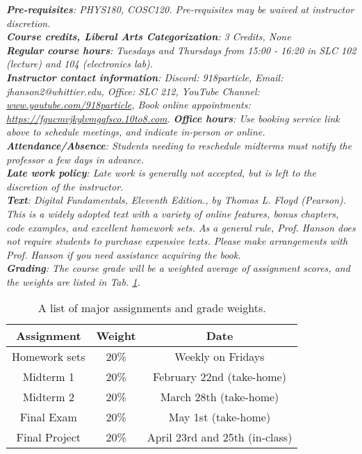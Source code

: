 \documentclass[10pt]{article}
\begin{document}
\noindent
\textit{\textbf{Pre-requisites}: PHYS180, COSC120.  Pre-requisites may be waived at instructor discretion.} \\
\textit{\textbf{Course credits, Liberal Arts Categorization}: 3 Credits, None} \\
\textit{\textbf{Regular course hours}: Tuesdays and Thursdays from 15:00 - 16:20 in SLC 102 (lecture) and 104 (electronics lab).} \\
\textit{\textbf{Instructor contact information}: Discord: 918particle, Email: jhanson2@whittier.edu, Office: SLC 212, YouTube Channel: \url{www.youtube.com/918particle}, Book online appointments: \url{https://fgucmvjkylvmgqfsco.10to8.com}.}
\noindent
\textit{\textbf{Office hours}: Use booking service link above to schedule meetings, and indicate in-person or online.} \\
\textit{\textbf{Attendance/Absence}: Students needing to reschedule midterms must notify the professor a few days in advance.} \\ 
\textit{\textbf{Late work policy}: Late work is generally not accepted, but is left to the discretion of the instructor.} \\
\textit{\textbf{Text}:  Digital Fundamentals, Eleventh Edition., by Thomas L. Floyd (Pearson).  This is a widely adopted text with a variety of online features, bonus chapters, code examples, and excellent homework sets.  As a general rule, Prof. Hanson does not require students to purchase expensive texts.  Please make arrangements with Prof. Hanson if you need assistance acquiring the book.} \\
\textit{\textbf{Grading}: The course grade will be a weighted average of assignment scores, and the weights are listed in Tab. \ref{tab:grading}.}
\begin{table}[hb]
\centering
\begin{tabular}{| c | c | c |}
\hline
\textbf{Assignment} & \textbf{Weight} & \textbf{Date} \\ \hline
Homework sets & 20\% & Weekly on Fridays \\ \hline
Midterm 1 & 20\% & February 22nd (take-home) \\ \hline
Midterm 2 & 20\% & March 28th (take-home) \\ \hline
Final Exam & 20\% & May 1st (take-home) \\ \hline
Final Project & 20\% & April 23rd and 25th (in-class) \\ \hline
\end{tabular}
\caption{\label{tab:grading} A list of major assignments and grade weights.}
\end{table} \\
\end{document}
